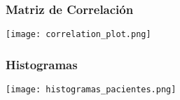 \documentclass[
	11pt, %
]{beamer}
\begin{document}

\begin{frame}
    \frametitle{Matriz de Correlación} %
    \begin{center}
        \texttt{[image: correlation\_plot.png]} %
    \end{center}
\end{frame}


\begin{frame}
    \frametitle{Histogramas} %
    \begin{center}
        \texttt{[image: histogramas\_pacientes.png]} %
    \end{center}
\end{frame}

\end{document}

